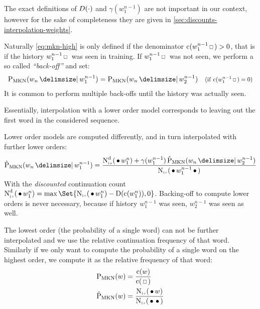 The exact definitions of $D(\cdot)$ and $\gamma(w_1^{n-1})$ are not
important in our context, however for the sake of completeness they are given
in \cref{sec:discounts-interpolation-weights}.

Naturally \cref{eq:mkn-high} is only defined if the denominator
${\Count(w_1^{n-1} \Skp) > 0}$, that is if the history $w_1^{n-1} \Skp$ was seen
in training.
If $w_1^{n-1} \Skp$ was not seen, we perform a so called \emph{``back-off''}
and set:
\begin{align}
  \label{eq:mkn-backoff}
  \ProbMKN{w_n}{w_1^{n-1}} = \ProbMKN{w_n}{w_2^{n-1}}
      & & \Condition{\Count(w_1^{n-1} \Skp) = 0}
\end{align}
It is common to perform multiple back-offs until the history was actually seen.

\begin{draft}
Essentially, interpolation with a lower order model corresponds to leaving out
the first word in the considered sequence.
\end{draft}
Lower order models are computed differently, and in turn interpolated with
further lower orders:
\begin{equation}
  \label{eq:mkn-low}
  \ProbMKN*{w_n}{w_1^{n-1}} =
    \frac{\DiscountedCount*(\WSkp w_1^n) + \gamma(w_1^{n-1}) \ProbMKN*{w_n}{w_2^{n-1}}}
         {\ContCountIp(\WSkp w_1^{n-1} \WSkp)} \\
\end{equation}
With the \emph{discounted} continuation count
${\DiscountedCount*(\WSkp w_1^n) = \max\Set{ \ContCountIp(\WSkp w_1^n) - \Discount(\Count(w_1^n)), 0 }}$.
Backing-off to compute lower orders is never necessary, because
if history $w_1^{n-1}$ was seen, $w_2^{n-1}$ was seen as well.

The lowest order (the probability of a single word) can not be further
interpolated and we use the relative continuation frequency of that word.
Similarly if we only want to compute the probability of a single word on the
highest order, we compute it as the relative frequency of that word:
\begin{subequations}
  \label{eq:mkn-lowest}
  \begin{align}
    \label{eq:mkn-lowest-abs}
    \ProbMKN {w} &= \frac{\Count(w)}{\Count(\Skp)} \\
    \label{eq:mkn-lowest-cont}
    \ProbMKN*{w} &= \frac{\ContCountIp(\WSkp w)}{\ContCountIp(\WSkp \WSkp)}
  \end{align}
\end{subequations}

